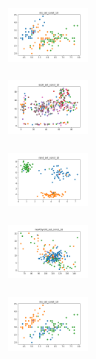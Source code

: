 \begin{figure}[H]
\begin{subfigure}
    \end{subfigure}
    \hfill
    \begin{subfigure}
        \centering
        \includegraphics[width=0.234\textwidth]{img/ageun/iris_set_const_10_589741062_clust.png}
    \end{subfigure}
    \hfill
    \begin{subfigure}
        \centering
        \includegraphics[width=0.234\textwidth]{img/ageun/ecoli_set_const_10_589741062_clust.png}
    \end{subfigure}
    \hfill
    \begin{subfigure}
        \centering
        \includegraphics[width=0.234\textwidth]{img/ageun/rand_set_const_10_589741062_clust.png}
    \end{subfigure}
    \hfill
    \begin{subfigure}
        \centering
        \includegraphics[width=0.234\textwidth]{img/ageun/newthyroid_set_const_10_589741062_clust.png}
    \end{subfigure}
    \hfill
    \begin{subfigure}
        \centering
        \includegraphics[width=0.234\textwidth]{img/ageun/iris_set_const_10_277451237_clust.png}
    \end{subfigure}
    \hfill

\end{figure}
